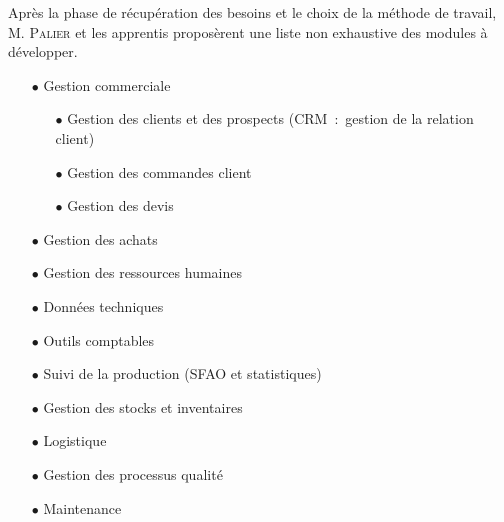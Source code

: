 Après la phase de récupération des besoins et le choix de la méthode de travail, M. \textsc{Palier} et les apprentis proposèrent une liste non exhaustive des modules à développer.
\\
\begin{itemize}
    \item[\tiny$\bullet$] Gestion commerciale
    \begin{itemize}
        \item[\tiny$\bullet$] Gestion des clients et des prospects (CRM~:~gestion de la relation client)
        \item[\tiny$\bullet$] Gestion des commandes client
        \item[\tiny$\bullet$] Gestion des devis
    \end{itemize}
    \item[\tiny$\bullet$] Gestion des achats
    \item[\tiny$\bullet$] Gestion des ressources humaines
    \item[\tiny$\bullet$] Données techniques
    \item[\tiny$\bullet$] Outils comptables
    \item[\tiny$\bullet$] Suivi de la production (SFAO et statistiques)
    \item[\tiny$\bullet$] Gestion des stocks et inventaires
    \item[\tiny$\bullet$] Logistique
    \item[\tiny$\bullet$] Gestion des processus qualité
    \item[\tiny$\bullet$] Maintenance
\end{itemize}